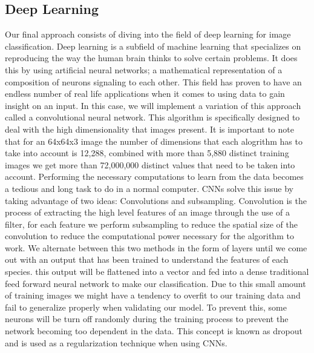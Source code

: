\documentclass[11pt]{article}
\begin{document}
\begin{singlespace}
\subsection{Deep Learning} 

Our final approach consists of diving into the field of deep learning for image classification. Deep learning is a subfield of machine learning that specializes on reproducing the way the human brain thinks to solve certain problems. It does this by using artificial neural networks; a mathematical representation of a composition of neurons signaling to each other. This field has proven to have an endless number of real life applications when it comes to using data to gain insight on an input. In this case, we will implement a variation of this approach called a convolutional neural network. This algorithm is specifically designed to deal with the high dimensionality that images present. It is important to note that for an 64x64x3 image the number of dimensions that each alogrithm has to take into account is 12,288, combined with more than 5,880 distinct training images we get more than 72,000,000 distinct values that need to be taken into account. Performing the necessary computations to learn from the data becomes a tedious and long task to do in a normal computer. CNNs solve this issue by taking advantage of two ideas: Convolutions and subsampling. Convolution is the process of extracting the high level features of an image through the use of a filter, for each feature we perform subsampling to reduce the spatial size of the convolution to reduce the computational power necessary for the algorithm to work. We alternate between this two methods in the form of layers until we come out with an output that has been trained to understand the features of each species. this output will be flattened into a vector and fed into a dense traditional feed forward neural network to make our classification. Due to this small amount of training images we might have a tendency to overfit to our training data and fail to generalize properly when validating our model. To prevent this, some neurons will be turn off randomly during the training process to prevent the network becoming too dependent in the data. This concept is known as dropout and is used as a regularization technique when using CNNs. \\


\end{singlespace}
\end{document}
